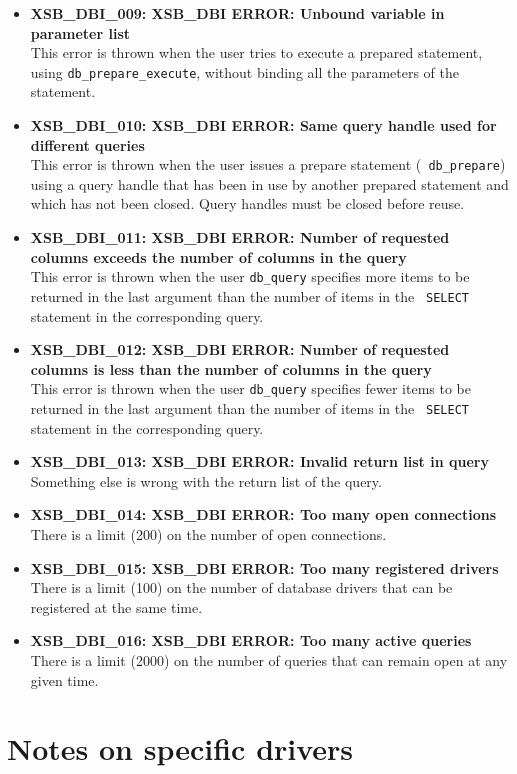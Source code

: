 \begin{itemize}
\item {\bf XSB\_DBI\_009: XSB\_DBI ERROR: Unbound variable in parameter list}\\
This error is thrown when the user tries to execute a prepared statement,
using {\tt db\_prepare\_execute}, without binding all the parameters of the
statement.

\item {\bf XSB\_DBI\_010: XSB\_DBI ERROR: Same query handle used for
    different queries}\\
  This error is thrown when the user issues a prepare statement ({\tt
    db\_prepare})  using a query
  handle that has been in use by another prepared statement and which has
  not been closed. Query handles must be closed before reuse.
\item {\bf XSB\_DBI\_011: XSB\_DBI ERROR: Number of requested columns exceeds the number of columns in the query}\\
  This error is thrown when the user {\tt db\_query}  specifies more items to be
  returned in the last argument than the number of items in the {\tt
    SELECT} statement in the corresponding query.
\item {\bf XSB\_DBI\_012: XSB\_DBI ERROR: Number of requested columns is less than the number of columns in the query}\\
  This error is thrown when the user {\tt db\_query}  specifies fewer items to be
  returned in the last argument than the number of items in the {\tt
    SELECT} statement in the corresponding query.
\item {\bf XSB\_DBI\_013: XSB\_DBI ERROR: Invalid return list in query}\\
  Something else is wrong with the return list of the query.
\item {\bf XSB\_DBI\_014: XSB\_DBI ERROR: Too many open connections}\\
  There is a limit (200) on the number of open connections.
\item {\bf XSB\_DBI\_015: XSB\_DBI ERROR: Too many registered drivers}\\
  There is a limit (100) on the number of database drivers that can be
  registered at the same time.
\item {\bf XSB\_DBI\_016: XSB\_DBI ERROR: Too many active queries}\\
  There is a limit (2000) on the number of queries that can remain
  open at any given time.
\end{itemize}

\section{Notes on specific drivers}

